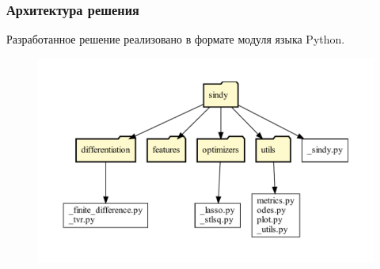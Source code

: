 \documentclass[pdf, hyperref={unicode}, aspectratio=169]{beamer}
\begin{document}
\begin{frame}
\frametitle{Архитектура решения}

Разработанное решение реализовано в формате модуля языка Python.
\begin{figure}
\includegraphics[height=0.8\textheight]{img/tree}
\end{figure}
\end{frame}
\end{document}
